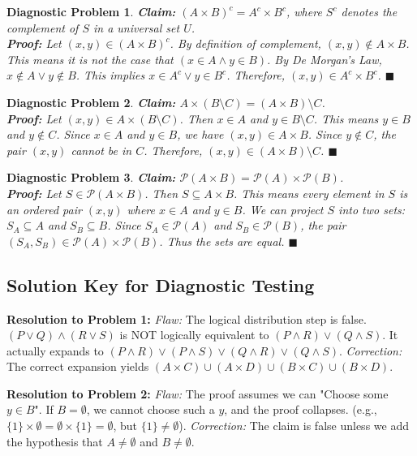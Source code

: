 \documentclass[11pt]{article}
\newtheorem{flawprob}{Diagnostic Problem}
\newcommand{\powerset}{\mathcal{P}}
\begin{document}
\begin{flawprob}
\textbf{Claim:} $(A \times B)^c = A^c \times B^c$, where $S^c$ denotes the complement of $S$ in a universal set $U$. \\
\textbf{Proof:} Let $(x, y) \in (A \times B)^c$. By definition of complement, $(x, y) \notin A \times B$. This means it is not the case that $(x \in A \land y \in B)$. By De Morgan's Law, $x \notin A \lor y \notin B$. This implies $x \in A^c \lor y \in B^c$. Therefore, $(x, y) \in A^c \times B^c$. $\blacksquare$
\end{flawprob}

\begin{flawprob}
\textbf{Claim:} $A \times (B \setminus C) = (A \times B) \setminus C$. \\
\textbf{Proof:} Let $(x, y) \in A \times (B \setminus C)$. Then $x \in A$ and $y \in B \setminus C$. This means $y \in B$ and $y \notin C$. Since $x \in A$ and $y \in B$, we have $(x, y) \in A \times B$. Since $y \notin C$, the pair $(x, y)$ cannot be in $C$. Therefore, $(x, y) \in (A \times B) \setminus C$. $\blacksquare$
\end{flawprob}

\begin{flawprob}
\textbf{Claim:} $\powerset(A \times B) = \powerset(A) \times \powerset(B)$. \\
\textbf{Proof:} Let $S \in \powerset(A \times B)$. Then $S \subseteq A \times B$. This means every element in $S$ is an ordered pair $(x, y)$ where $x \in A$ and $y \in B$. We can project $S$ into two sets: $S_A \subseteq A$ and $S_B \subseteq B$. Since $S_A \in \powerset(A)$ and $S_B \in \powerset(B)$, the pair $(S_A, S_B) \in \powerset(A) \times \powerset(B)$. Thus the sets are equal. $\blacksquare$
\end{flawprob}

\newpage
\subsection{Solution Key for Diagnostic Testing}

\textbf{Resolution to Problem 1:}
\textit{Flaw:} The logical distribution step is false. $(P \lor Q) \land (R \lor S)$ is NOT logically equivalent to $(P \land R) \lor (Q \land S)$. It actually expands to $(P \land R) \lor (P \land S) \lor (Q \land R) \lor (Q \land S)$. 
\textit{Correction:} The correct expansion yields $(A \times C) \cup (A \times D) \cup (B \times C) \cup (B \times D)$.

\textbf{Resolution to Problem 2:}
\textit{Flaw:} The proof assumes we can "Choose some $y \in B$". If $B = \emptyset$, we cannot choose such a $y$, and the proof collapses. (e.g., $\{1\} \times \emptyset = \emptyset \times \{1\} = \emptyset$, but $\{1\} \neq \emptyset$).
\textit{Correction:} The claim is false unless we add the hypothesis that $A \neq \emptyset$ and $B \neq \emptyset$.
\end{document}
